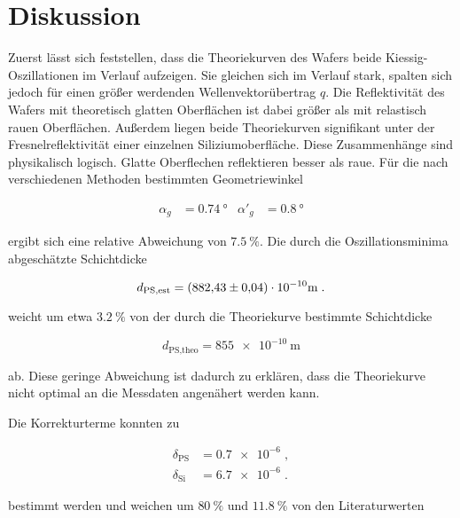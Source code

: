\section{Diskussion}
\label{sec:Diskussion}

Zuerst lässt sich feststellen, dass die Theoriekurven des Wafers beide Kiessig-Oszillationen im Verlauf aufzeigen.
Sie gleichen sich im Verlauf stark, spalten sich jedoch für einen größer werdenden Wellenvektorübertrag $q$.
Die Reflektivität des Wafers mit theoretisch glatten Oberflächen ist dabei größer als mit relastisch rauen 
Oberflächen. Außerdem liegen beide Theoriekurven signifikant unter der Fresnelreflektivität einer 
einzelnen Siliziumoberfläche.
Diese Zusammenhänge sind physikalisch logisch. Glatte Oberflechen reflektieren besser als raue.
Für die nach verschiedenen Methoden bestimmten Geometriewinkel

\vspace{-10pt}
\begin{align*}
    \alpha_g &= \SI{0.74}{\degree} & \alpha'_g &= \SI{0.8}{\degree}
\end{align*}

ergibt sich eine relative Abweichung von $\SI{7.5}{\percent}$.
Die durch die Oszillationsminima abgeschätzte Schichtdicke

\vspace{-10pt}
\begin{equation*}
    d_\text{PS,est} = (\num{882.43 +- 0.04}) \cdot 10^{-10} \si{\meter} \; .
\end{equation*}

weicht um etwa $\SI{3.2}{\percent}$ von der durch die Theoriekurve bestimmte 
Schichtdicke 

\vspace{-10pt}
\begin{equation*}
    d_\text{PS,theo} = \SI{855e-10}{\meter}
\end{equation*} 

ab. Diese geringe Abweichung ist dadurch zu erklären, dass die Theoriekurve nicht
optimal an die Messdaten angenähert werden kann.

Die Korrekturterme konnten zu 

\vspace{-25pt}
\begin{align*}
    \delta_\text{PS} &= \num{0.7e-6} \; , \\
    \delta_\text{Si} &= \num{6.7e-6} \; .
\end{align*}

bestimmt werden und weichen um $\SI{80}{\percent}$ und 
$\SI{11.8}{\percent}$ von den Literaturwerten \cite{tolan}

